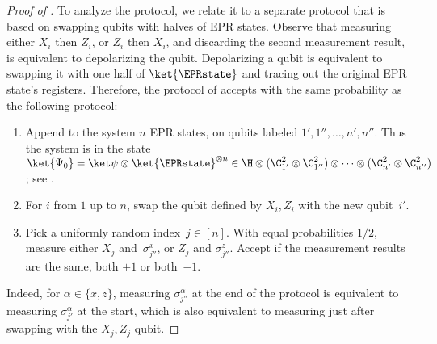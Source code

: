 \documentclass[11pt]{article}
\begin{document}
\begin{proof}[Proof of ]
To analyze the protocol, we relate it to a separate protocol that is based on swapping qubits with halves of EPR states.  Observe that measuring either $X_i$ then $Z_i$, or $Z_i$ then $X_i$, and discarding the second measurement result, is equivalent to depolarizing the qubit.  Depolarizing a qubit is equivalent to swapping it with one half of $\ket{\EPRstate}$ and tracing out the original EPR state's registers.  Therefore, the protocol of  accepts with the same probability as the following protocol: 
\begin{enumerate}
\item Append to the system $n$ EPR states, on qubits labeled $1', 1'', \ldots, n', n''$.  Thus the system is in the state $\ket{\Psi_0} = \ket \psi \otimes \ket{\EPRstate}^{\otimes n} \in \H \otimes (\C^2_{1'} \otimes \C^2_{1''}) \otimes \cdots \otimes (\C^2_{n'} \otimes \C^2_{n''})$; see .  
\item For $i$ from $1$ up to $n$, swap the qubit defined by $X_i, Z_i$ with the new qubit~$i'$.  
\item Pick a uniformly random index~$j \in [n]$.  With equal probabilities $1/2$, measure either $X_j$ and~$\sigma^x_{j''}$, or $Z_j$ and $\sigma^z_{j''}$.  Accept if the measurement results are the same, both $+1$ or both~$-1$.  
\end{enumerate}
Indeed, for $\alpha \in \{x, z\}$, measuring $\sigma^\alpha_{j''}$ at the end of the protocol is equivalent to measuring $\sigma^\alpha_{j'}$ at the start, which is also equivalent to measuring just after swapping with the $X_j, Z_j$ qubit.  


\end{proof}
\end{document}
